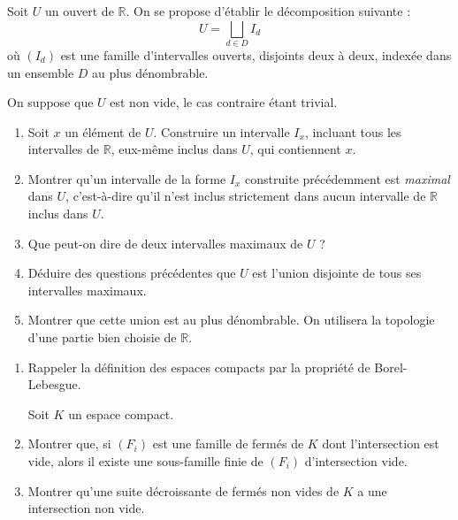 \begin{exer}
Soit $U$ un ouvert de $\mathbb{R}$. On se propose d'\'etablir le d\'ecomposition suivante :
\[U=\bigsqcup\limits_{d\in D} I_d\]
o\`u $(I_d)$ est une famille d'intervalles ouverts, disjoints deux \`a deux, index\'ee dans un ensemble $D$ au plus d\'enombrable.

On suppose que $U$ est non vide, le cas contraire \'etant trivial.
\begin{enumerate}
\item Soit $x$ un \'el\'ement de $U$. Construire un intervalle $I_x$, incluant tous les intervalles de $\mathbb{R}$, eux-m\^eme inclus dans $U$, qui contiennent $x$.
\item Montrer qu'un intervalle de la forme $I_x$ construite pr\'ec\'edemment est \textit{maximal} dans $U$, c'est-\`a-dire qu'il n'est inclus strictement dans aucun intervalle de $\mathbb{R}$ inclus dans $U$.
\item Que peut-on dire de deux intervalles maximaux de $U$ ?
\item D\'eduire des questions pr\'ec\'edentes que $U$ est l'union disjointe de tous ses intervalles maximaux.
\item Montrer que cette union est au plus d\'enombrable. On utilisera la topologie d'une partie bien choisie de $\mathbb{R}$.
\end{enumerate}
\end{exer}

\begin{exer}
\begin{enumerate}
\item Rappeler la définition des espaces compacts par la propriété de Borel-Lebesgue.

\smallskip
Soit $K$ un espace compact.
\item Montrer que, si $(F_i)$ est une famille de fermés de $K$ dont l'intersection est vide, alors il existe une sous-famille finie de $(F_i)$ d'intersection vide.
\item Montrer qu'une suite décroissante de fermés non vides de $K$ a une intersection non vide.
\end{enumerate}
\end{exer}

